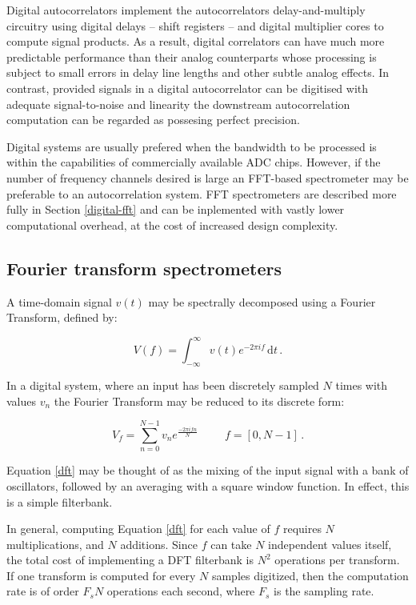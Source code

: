 \documentclass{ws-rv961x669}
\begin{document}
Digital autocorrelators implement the autocorrelators delay-and-multiply circuitry using digital delays -- shift registers -- and digital multiplier cores to compute signal products. As a result, digital correlators can have much more predictable performance than their analog counterparts whose processing is subject to small errors in delay line lengths and other subtle analog effects. In contrast, provided signals in a digital autocorrelator can be digitised with adequate signal-to-noise and linearity the downstream autocorrelation computation can be regarded as possesing perfect precision.

Digital systems are usually prefered when the bandwidth to be processed is within the capabilities of commercially available ADC chips. However, if the number of frequency channels desired is large an FFT-based spectrometer may be preferable to an autocorrelation system. FFT spectrometers are described more fully in Section \ref{digital-fft} and can be inplemented with vastly lower computational overhead, at the cost of increased design complexity.

\subsection{Fourier transform spectrometers}

A time-domain signal $v(t)$ may be spectrally decomposed using a Fourier Transform, defined by:

\begin{equation}
 \label{ft}
 V(f) = \int_{-\infty}^{\infty} v(t) e^{-2\pi i f} \,\mathrm{d}t\, .
\end{equation}

In a digital system, where an input has been discretely sampled $N$ times with values $v_n$ the Fourier Transform may be reduced to its discrete form: 

\begin{equation}
 \label{dft}
 V_f = \sum_{n = 0}^{N-1} v_n e^{\frac{-2\pi i f n}{N}} \hspace{1cm} f = [0, N-1]\,.
\end{equation}

Equation \ref{dft} may be thought of as the mixing of the input signal with a bank of oscillators, followed by an averaging with a square window function. In effect, this is a simple filterbank.

In general, computing Equation \ref{dft} for each value of $f$ requires $N$ multiplications, and $N$ additions. Since $f$ can take $N$ independent values itself, the total cost of implementing a DFT filterbank is $N^2$ operations per transform. If one transform is computed for every $N$ samples digitized, then the computation rate is of order $F_sN$ operations each second, where $F_s$ is the sampling rate.
\end{document}
